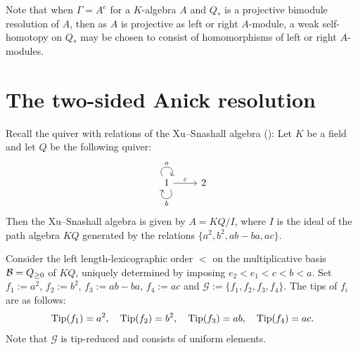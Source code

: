 \documentclass[10pt, reqno]{amsart}
\theoremstyle{definition}
\theoremstyle{remark}
\numberwithin{equation}{section}
\begin{document}
Note that when $\Gamma=A^e$ for a $K$-algebra $A$ and $Q_*$ is a projective bimodule resolution of $A$, then as $A$ is projective as left or right $A$-module, a weak self-homotopy on $Q_*$ may be chosen to  consist of homomorphisms of left or right $A$-modules. 



\section{The two-sided Anick resolution}\label{sec: Anick resolution}
 Recall the quiver with relations of the Xu--Snashall algebra (\cite[Example 4.1]{Sna09}):
 Let \(K\) be a field and let \(Q\) be the following quiver:
\[
\begin{tikzcd}
    1 \arrow[loop above, out =120, in =60, looseness=4,"a"] \arrow[loop below,out =300, in =240, looseness=5,"b"] \arrow[r,"c"] & 2
\end{tikzcd}
\]
Then the Xu--Snashall algebra is given by  \(A=KQ/I\), where \(I\) is the ideal of the path algebra \(KQ\) generated by the relations \(\{a^2, b^2, ab-ba, ac\}\). 

 

Consider the  left length-lexicographic order \(<\) on the multiplicative basis \(\mathcal{B} = Q_{\ge 0}\) of \(KQ\), uniquely determined by imposing \(e_2 < e_1 < c < b < a\). 
Set $f_1 := a^2$, $f_2 := b^2$, $f_3 := ab - ba$, $f_4 := ac$  and \( \mathscr{G} := \{f_1, f_2, f_3, f_4\}\). The tips of \(f_i\) are as follows:
\[
\mathrm{Tip}(f_1) = a^2,\quad 
\mathrm{Tip}(f_2) = b^2,\quad 
\mathrm{Tip}(f_3) = ab,\quad 
\mathrm{Tip}(f_4) = ac.
\]
Note that \(\mathscr{G}\) is tip-reduced and consists of uniform elements. 
\end{document}
